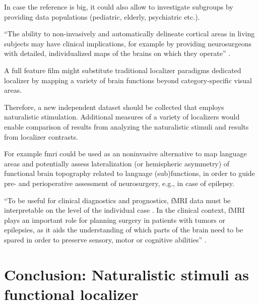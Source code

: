 

%
In case the reference is big, it could also allow to investigate subgroups by
providing data populations (pediatric, elderly, psychiatric etc.).

%
``The ability to non-invasively and automatically delineate cortical areas in
living subjects may have clinical implications, for example by providing
neurosurgeons with detailed, individualized maps of the brains on which they
operate'' \citep{glasser2016multi}.

%
A full feature film might substitute traditional localizer paradigms dedicated
localizer by mapping a variety of brain functions beyond category-specific
visual areas.

%
Therefore, a new independent dataset should be collected that employs
naturalistic stimulation.
%
Additional measures of a variety of localizers would enable comparison of
results from analyzing the naturalistic stimuli and results from localizer
contrasts.

%
For example \ac{fmri} could be used as an noninvasive alternative to map
language areas and potentially assess lateralization (or hemispheric asymmetry)
of functional brain topography related to language (sub)functions, in order to
guide pre- and perioperative assessment of neurosurgery, e.g., in case of
epilepsy.

%
``To be useful for clinical diagnostics and prognostics, fMRI data must be
interpretable on the level of the individual case \citep{dubois2016building}.
%
In the clinical context, fMRI plays an important role for planning surgery in
patients with tumors or epilepsies, as it aids the understanding of which parts
of the brain need to be spared in order to preserve sensory, motor or cognitive
abilities'' \citep{wegrzyn2018thought}.



\section{Conclusion: Naturalistic stimuli as functional localizer}

